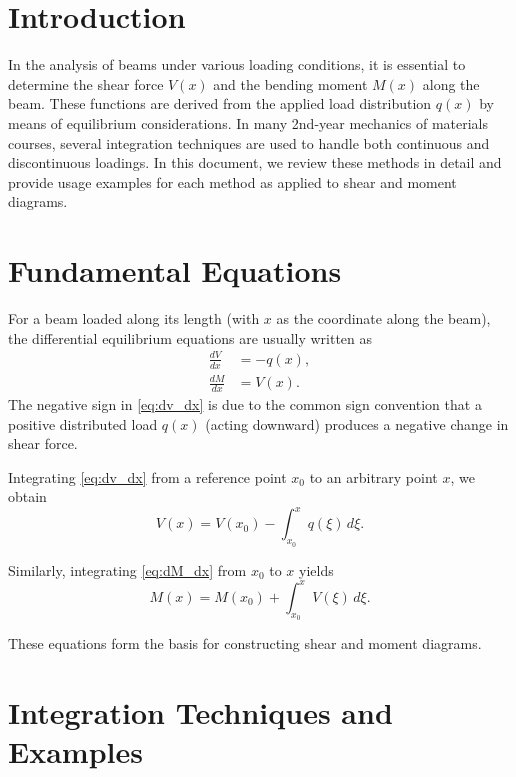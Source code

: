 \documentclass[12pt]{article}
\begin{document}
\section{Introduction}

In the analysis of beams under various loading conditions, it is essential to determine the shear force $V(x)$ and the bending moment $M(x)$ along the beam. These functions are derived from the applied load distribution $q(x)$ by means of equilibrium considerations. In many 2nd-year mechanics of materials courses, several integration techniques are used to handle both continuous and discontinuous loadings. In this document, we review these methods in detail and provide usage examples for each method as applied to shear and moment diagrams.

\section{Fundamental Equations}

For a beam loaded along its length (with $x$ as the coordinate along the beam), the differential equilibrium equations are usually written as
\begin{align}
  \frac{dV}{dx} &= -q(x), \label{eq:dv_dx} \\
  \frac{dM}{dx} &= V(x). \label{eq:dM_dx}
\end{align}
The negative sign in \eqref{eq:dv_dx} is due to the common sign convention that a positive distributed load $q(x)$ (acting downward) produces a negative change in shear force.

Integrating \eqref{eq:dv_dx} from a reference point $x_0$ to an arbitrary point $x$, we obtain
\begin{equation}
  V(x) = V(x_0) - \int_{x_0}^{x} q(\xi)\, d\xi.
  \label{eq:V_integral}
\end{equation}

Similarly, integrating \eqref{eq:dM_dx} from $x_0$ to $x$ yields
\begin{equation}
  M(x) = M(x_0) + \int_{x_0}^{x} V(\xi)\, d\xi.
  \label{eq:M_integral}
\end{equation}

These equations form the basis for constructing shear and moment diagrams.

\section{Integration Techniques and Examples}
\end{document}
